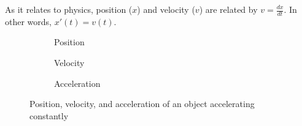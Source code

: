 \documentclass[12pt, letterpaper]{article}
\begin{document}
As it relates to physics, position ($x$) and velocity ($v$) are related by $v=\frac{dx}{dt}$.
In other words, $x'(t) = v(t)$.

\begin{figure}[H]
  \centering
  \begin{subfigure}[H]{0.3\textwidth}
    \centering
    
    \caption{Position}
    \label{fig:010}
  \end{subfigure}
  \begin{subfigure}[H]{0.3\textwidth}
    \centering
    
    \caption{Velocity}
    \label{fig:011}
  \end{subfigure}
  \begin{subfigure}[H]{0.3\textwidth}
    \centering
    
    \caption{Acceleration}
    \label{fig:012}
  \end{subfigure}
  \caption{Position, velocity, and acceleration of an object accelerating constantly}
  \label{fig:posVelAcc}
\end{figure}
\end{document}
